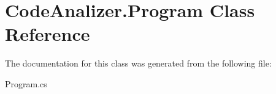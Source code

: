 \hypertarget{class_code_analizer_1_1_program}{}\section{Code\+Analizer.\+Program Class Reference}
\label{class_code_analizer_1_1_program}


The documentation for this class was generated from the following file\+:\begin{DoxyCompactItemize}
\item 
Program.\+cs\end{DoxyCompactItemize}
